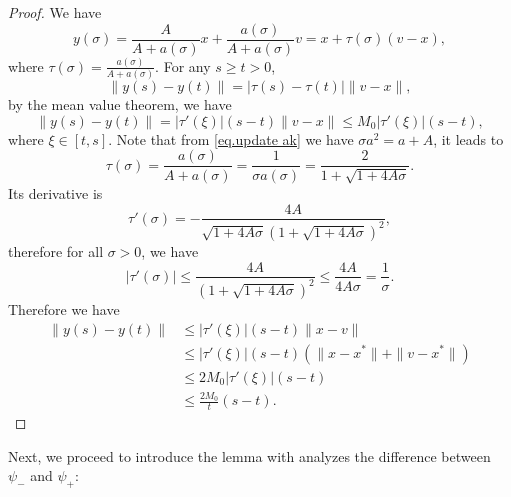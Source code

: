 \documentclass{article}
\numberwithin{equation}{section}
\numberwithin{equation}{section}
\begin{document}
\begin{proof}
    We have
    \begin{equation*}
        y(\sigma) = \frac{A}{A+a(\sigma)}x+\frac{a(\sigma)}{A+a(\sigma)}v = x + \tau (\sigma) (v-x),
    \end{equation*}
    where $\tau(\sigma) = \frac{a(\sigma)}{A+a(\sigma)}.$ For any $s\geq t>0$,
    \begin{equation*}
        \|y(s)-y(t)\| = \left|\tau(s)-\tau(t)\right| \|v-x\|,
    \end{equation*}
    by the mean value theorem, we have
    \begin{equation*}
        \|y(s)-y(t)\| = \left|\tau'(\xi)\right|(s-t) \|v-x\|\leq M_0\left|\tau'(\xi)\right|(s-t),
    \end{equation*}
    where $\xi \in \left[t,s\right]$. Note that from \eqref{eq.update ak} we have $\sigma a^2=a+A$, it leads to
    \begin{equation*}
        \tau(\sigma) = \frac{a(\sigma)}{A+a(\sigma)} = \frac{1}{\sigma a(\sigma)} = \frac{2}{1+\sqrt{1+4A\sigma}}.
    \end{equation*}
    Its derivative is
    \begin{equation*}
        \tau'(\sigma) = -\frac{4A}{\sqrt{1+4A\sigma}\left(1+\sqrt{1+4A\sigma}\right)^2},
    \end{equation*}
    therefore for all $\sigma>0$, we have
    \begin{equation*}
        \left|\tau'(\sigma)\right| \leq \frac{4A}{\left(1+\sqrt{1+4A\sigma}\right)^2}  \leq \frac{4A}{4A\sigma}  = \frac{1}{\sigma}.
    \end{equation*}
    Therefore we have
    \begin{equation*}
        \begin{aligned}
            \|y(s)-y(t)\| & \leq \left|\tau'(\xi)\right|(s-t)\|x-v\|                          \\
                          & \leq \left|\tau'(\xi)\right|(s-t)\left(\|x-x^*\|+\|v-x^*\|\right) \\
                          & \leq 2M_0\left|\tau'(\xi)\right|(s-t)                             \\
                          & \leq \frac{2M_0}{t}(s-t).
        \end{aligned}
    \end{equation*}
\end{proof}
Next, we proceed to introduce the lemma with analyzes the difference between $\psi_-$ and $\psi_+$:
\end{document}
